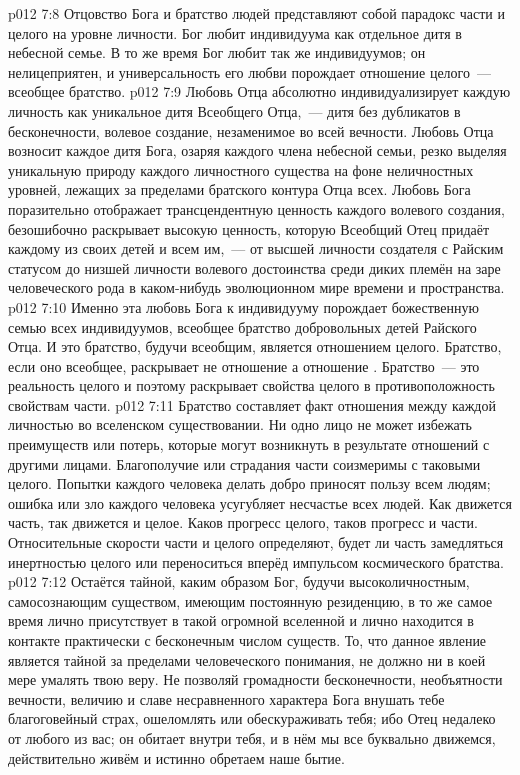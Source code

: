 \vs p012 7:8 Отцовство Бога и братство людей представляют собой парадокс части и целого на уровне личности. Бог любит  индивидуума как отдельное дитя в небесной семье. В то же время Бог любит так же  индивидуумов; он нелицеприятен, и универсальность его любви порождает отношение целого~--- всеобщее братство.
\vs p012 7:9 Любовь Отца абсолютно индивидуализирует каждую личность как уникальное дитя Всеобщего Отца,~--- дитя без дубликатов в бесконечности, волевое создание, незаменимое во всей вечности. Любовь Отца возносит каждое дитя Бога, озаряя каждого члена небесной семьи, резко выделяя уникальную природу каждого личностного существа на фоне неличностных уровней, лежащих за пределами братского контура Отца всех. Любовь Бога поразительно отображает трансцендентную ценность каждого волевого создания, безошибочно раскрывает высокую ценность, которую Всеобщий Отец придаёт каждому из своих детей и всем им,~--- от высшей личности создателя с Райским статусом до низшей личности волевого достоинства среди диких племён на заре человеческого рода в каком\hyp{}нибудь эволюционном мире времени и пространства.
\vs p012 7:10 Именно эта любовь Бога к индивидууму порождает божественную семью всех индивидуумов, всеобщее братство добровольных детей Райского Отца. И это братство, будучи всеобщим, является отношением целого. Братство, если оно всеобщее, раскрывает не отношение  а отношение . Братство~--- это реальность целого и поэтому раскрывает свойства целого в противоположность свойствам части.
\vs p012 7:11 Братство составляет факт отношения между каждой личностью во вселенском существовании. Ни одно лицо не может избежать преимуществ или потерь, которые могут возникнуть в результате отношений с другими лицами. Благополучие или страдания части соизмеримы с таковыми целого. Попытки каждого человека делать добро приносят пользу всем людям; ошибка или зло каждого человека усугубляет несчастье всех людей. Как движется часть, так движется и целое. Каков прогресс целого, таков прогресс и части. Относительные скорости части и целого определяют, будет ли часть замедляться инертностью целого или переноситься вперёд импульсом космического братства.
\vs p012 7:12 \pc Остаётся тайной, каким образом Бог, будучи высоколичностным, самосознающим существом, имеющим постоянную резиденцию, в то же самое время лично присутствует в такой огромной вселенной и лично находится в контакте практически с бесконечным числом существ. То, что данное явление является тайной за пределами человеческого понимания, не должно ни в коей мере умалять твою веру. Не позволяй громадности бесконечности, необъятности вечности, величию и славе несравненного характера Бога внушать тебе благоговейный страх, ошеломлять или обескураживать тебя; ибо Отец недалеко от любого из вас; он обитает внутри тебя, и в нём мы все буквально движемся, действительно живём и истинно обретаем наше бытие.
